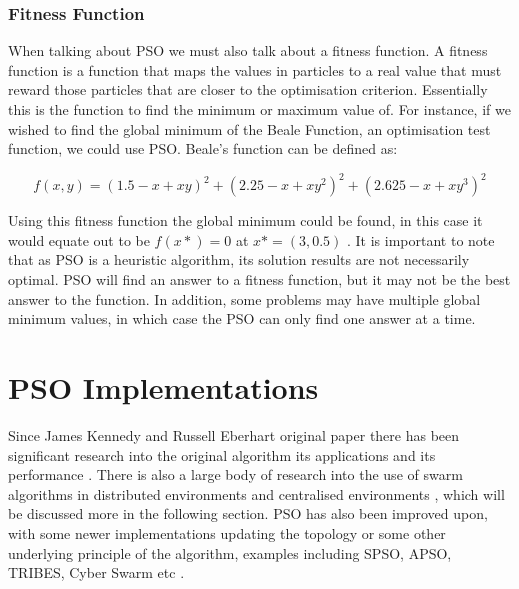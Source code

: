 \documentclass[oneside,12pt]{book}
\begin{document}
\subsubsection{Fitness Function}
When talking about PSO we must also talk about a fitness function. A fitness function is a function that maps the values in particles to a real value that must reward those particles that are closer to the optimisation criterion. Essentially this is the function to find the minimum or maximum value of. For instance, if we wished to find the global minimum of the Beale Function, an optimisation test function, we could use PSO. Beale's function can be defined as:

\begin{equation}
f(x, y) = (1.5-x+xy)^2+(2.25-x+xy^2)^2+(2.625-x+xy^3)^2
\end{equation}

Using this fitness function the global minimum could be found, in this case it would equate out to be $f(x*)=0$ at $x*=(3,0.5)$ \cite{bingham}. It is important to note that as PSO is a heuristic algorithm, its solution results are not necessarily optimal. PSO will find an answer to a fitness function, but it may not be the best answer to the function. In addition, some problems may have multiple global minimum values, in which case the PSO can only find one answer at a time.

\section{PSO Implementations}
Since James Kennedy and Russell Eberhart original paper there has been significant research into the original algorithm \cite{piotrowski_napiorkowski_piotrowska_2020, bai_2010, imrantextordfeminine2013overview, wang_tan_liu_2017} its applications \cite{hereford_2006, beni_2005, blum_li, raquel2005effective} and its performance \cite{yin_yu_wang_wang_2006, kennedy_1999}. There is also a large body of research into the use of swarm algorithms in distributed environments \cite{akat_gazi_2008, salza_ferrucci_2019, peleg_2005} and centralised environments \cite{trelea_2003, xie2003overview, poli2007particle}, which will be discussed more in the following section. PSO has also been improved upon, with some newer implementations updating the topology or some other underlying principle of the algorithm, examples including SPSO, APSO, TRIBES, Cyber Swarm etc \cite{zhou2009gpu, oca_stutzle_birattari_dorigo_2009, cooren2009performance, yin2010cyber}.
\end{document}

